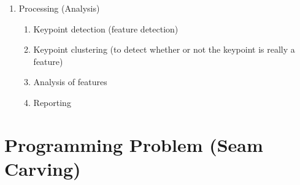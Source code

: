 \documentclass{article}
\begin{document}
\begin{enumerate}
\begin{enumerate}
\begin{enumerate}
		\end{enumerate}
		\item Processing (Analysis)
		\begin{enumerate}
	    	\item Keypoint detection (feature detection)
	    	\item Keypoint clustering (to detect whether or not the keypoint is really
	    	a feature)
	    	\item Analysis of features
	    	\item Reporting
		\end{enumerate}
	\end{enumerate}
\end{enumerate}
\pagebreak

\label{Programming Problem (Seam Carving)}
\section{Programming Problem (Seam Carving)}
\end{document}
